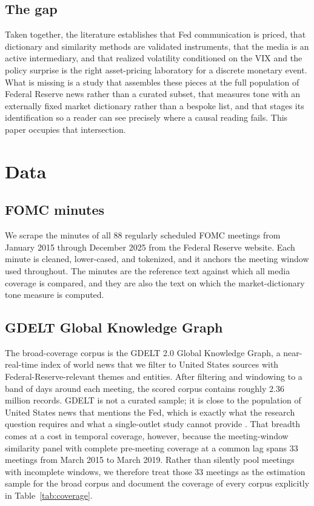 \documentclass[11pt,a4paper]{article}
\begin{document}
\subsection{The gap}

Taken together, the literature establishes that Fed communication is priced, that
dictionary and similarity methods are validated instruments, that the media is an
active intermediary, and that realized volatility conditioned on the VIX and the
policy surprise is the right asset-pricing laboratory for a discrete monetary
event. What is missing is a study that assembles these pieces at the full
population of Federal Reserve news rather than a curated subset, that measures tone
with an externally fixed market dictionary rather than a bespoke list, and that
stages its identification so a reader can see precisely where a causal reading
fails. This paper occupies that intersection.

\section{Data}
\label{sec:data}

\subsection{FOMC minutes}

We scrape the minutes of all 88 regularly scheduled FOMC meetings from January
2015 through December 2025 from the Federal Reserve website. Each minute is
cleaned, lower-cased, and tokenized, and it anchors the meeting window used
throughout. The minutes are the reference text against which all media coverage is
compared, and they are also the text on which the market-dictionary tone measure is
computed.

\subsection{GDELT Global Knowledge Graph}

The broad-coverage corpus is the GDELT 2.0 Global Knowledge Graph, a
near-real-time index of world news that we filter to United States sources with
Federal-Reserve-relevant themes and entities. After filtering and windowing to a
band of days around each meeting, the scored corpus contains roughly 2.36 million
records. GDELT is not a curated sample; it is close to the population of United
States news that mentions the Fed, which is exactly what the research question
requires and what a single-outlet study cannot provide \citep{leetaru2013gdelt}.
That breadth comes at a cost in temporal coverage, however, because the
meeting-window similarity panel with complete pre-meeting coverage at a common lag
spans 33 meetings from March 2015 to March 2019. Rather than silently pool meetings
with incomplete windows, we therefore treat those 33 meetings as the estimation
sample for the broad corpus and document the coverage of every corpus explicitly in
Table~\ref{tab:coverage}.
\end{document}
